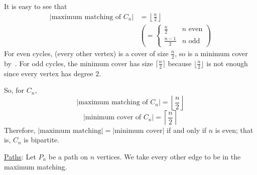 It is easy to see that
\begin{align*}
    |\text{maximum matching of }C_n|
     & =\left\lfloor \frac{n}{2} \right\rfloor \\
     & \left( =
    \begin{cases}
            \frac{n}{2}   & n \text{ even} \\
            \frac{n-1}{2} & n \text{ odd}
        \end{cases}\right)
\end{align*}
For even cycles, (every other vertex) is a cover of size $ \frac{n}{2} $, so
is a minimum cover by~.
For odd cycles, the minimum cover has size $ \lceil \frac{n}{2} \rceil $
because $ \lfloor \frac{n}{2} \rfloor  $ is not enough since every vertex has
degree $ 2 $.

So, for $ C_n $,
\[ |\text{maximum matching of }C_n|=\left\lfloor \frac{n}{2} \right\rfloor \]
\[ |\text{minimum cover of }C_n|=\left\lceil \frac{n}{2} \right\rceil \]
Therefore, $ |\text{maximum matching}|=|\text{minimum cover}| $ if and only if
$ n $ is even; that is, $ C_n $ is bipartite.

\underline{Paths}: Let $ P_n $ be a path on $ n $ vertices. We take
every other edge to be in the maximum matching.

